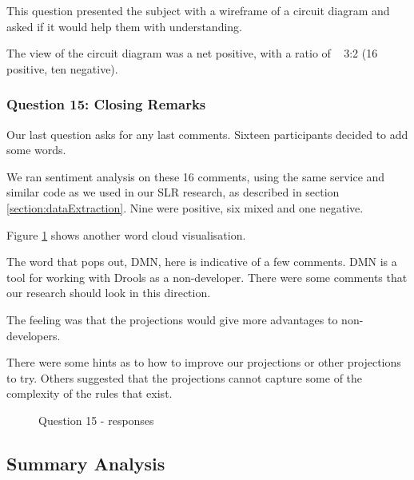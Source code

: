 This question presented the subject with a wireframe of a circuit diagram and asked if it would help them with understanding.

The view of the circuit diagram was a net positive, with a ratio of ~ 3:2 (16 positive, ten negative).

\subsubsection{Question 15: Closing Remarks}

Our last question asks for any last comments.
Sixteen participants decided to add some words.

We ran sentiment analysis on these 16 comments, using the same service and similar code as we used in our SLR research, as described in section \ref{section:dataExtraction}.
Nine were positive, six mixed and one negative.

Figure \ref{fig:Q15_wordcloud} shows another word cloud visualisation.

The word that pops out, DMN, here is indicative of a few comments.
DMN is a tool for working with Drools as a non-developer.
There were some comments that our research should look in this direction.

The feeling was that the projections would give more advantages to non-developers.

There were some hints as to how to improve our projections or other projections to try.
Others suggested that the projections cannot capture some of the complexity of the rules that exist.

\begin{figure}[H]
    \centering
    \caption{Question 15 - responses}
    \label{fig:Q15_wordcloud}
\end{figure}

\subsection{Summary Analysis}

